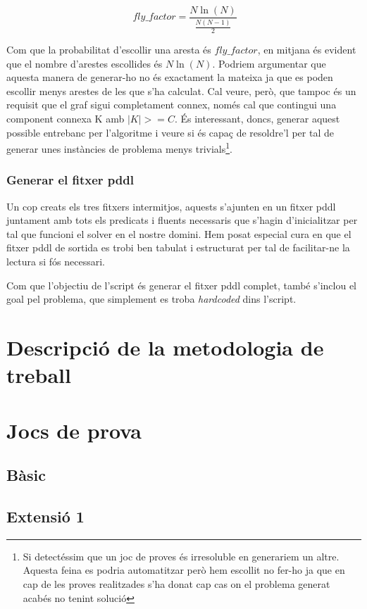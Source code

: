 \documentclass[11pt,a4paper]{article}
\begin{document}
\[
\ fly\_factor = \frac{N \ln(N)}{\frac{N (N-1)}{2}}
\]

Com que la probabilitat d'escollir una aresta és $fly\_factor$, en mitjana és evident que el nombre d'arestes escollides és $N\ln(N)$. Podriem argumentar que aquesta manera de generar-ho no és exactament la mateixa ja que es poden escollir menys arestes de les que s'ha calculat. Cal veure, però, que tampoc és un requisit que el graf sigui completament connex, només cal que contingui una component connexa K amb $|K| >= C$. És interessant, doncs, generar aquest possible entrebanc per l'algoritme i veure si és capaç de resoldre'l per tal de generar unes instàncies de problema menys trivials\footnote{Si detectéssim que un joc de proves és irresoluble en generariem un altre. Aquesta feina es podria automatitzar però hem escollit no fer-ho ja que en cap de les proves realitzades s'ha donat cap cas on el problema generat acabés no tenint solució}.

\subsubsection*{Generar el fitxer pddl}

Un cop creats els tres fitxers intermitjos, aquests s'ajunten en un fitxer pddl juntament amb tots els predicats i fluents necessaris que s'hagin d'inicialitzar per tal que funcioni el solver en el nostre domini. Hem posat especial cura en que el fitxer pddl de sortida es trobi ben tabulat i estructurat per tal de facilitar-ne la lectura si fós necessari.

Com que l'objectiu de l'script és generar el fitxer pddl complet, també s'inclou el goal pel problema, que simplement es troba \emph{hardcoded} dins l'script.

\section{Descripció de la metodologia de treball}


\section{Jocs de prova}
\subsection{Bàsic}
\subsection{Extensió 1}
\end{document}
